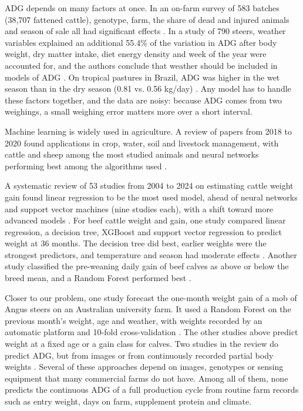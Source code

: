 \documentclass[12pt]{article}
\begin{document}
ADG depends on many factors at once. In an on-farm survey of 583 batches (38,707 fattened cattle), genotype, farm, the share of dead and injured animals and season of sale all had significant effects \cite{veneto}. In a study of 790 steers, weather variables explained an additional 55.4\% of the variation in ADG after body weight, dry matter intake, diet energy density and week of the year were accounted for, and the authors conclude that weather should be included in models of ADG \cite{ndsuweather}. On tropical pastures in Brazil, ADG was higher in the wet season than in the dry season (0.81 vs. 0.56 kg/day) \cite{tambara2021}. Any model has to handle these factors together, and the data are noisy: because ADG comes from two weighings, a small weighing error matters more over a short interval.

Machine learning is widely used in agriculture. A review of papers from 2018 to 2020 found applications in crop, water, soil and livestock management, with cattle and sheep among the most studied animals and neural networks performing best among the algorithms used \cite{benos2021}.

A systematic review of 53 studies from 2004 to 2024 on estimating cattle weight gain found linear regression to be the most used model, ahead of neural networks and support vector machines (nine studies each), with a shift toward more advanced models \cite{hossain2025review}. For beef cattle weight and gain, one study compared linear regression, a decision tree, XGBoost and support vector regression to predict weight at 36 months. The decision tree did best, earlier weights were the strongest predictors, and temperature and season had moderate effects \cite{tuyishime2025}. Another study classified the pre-weaning daily gain of beef calves as above or below the breed mean, and a Random Forest performed best \cite{grzesiak2023}.

Closer to our problem, one study forecast the one-month weight gain of a mob of Angus steers on an Australian university farm. It used a Random Forest on the previous month's weight, age and weather, with weights recorded by an automatic platform and 10-fold cross-validation \cite{hossain2025mob}. The other studies above predict weight at a fixed age or a gain class for calves. Two studies in the review do predict ADG, but from images \cite{cominotte2020} or from continuously recorded partial body weights \cite{macneil2021}. Several of these approaches depend on images, genotypes or sensing equipment that many commercial farms do not have. Among all of them, none predicts the continuous ADG of a full production cycle from routine farm records such as entry weight, days on farm, supplement protein and climate.
\end{document}
